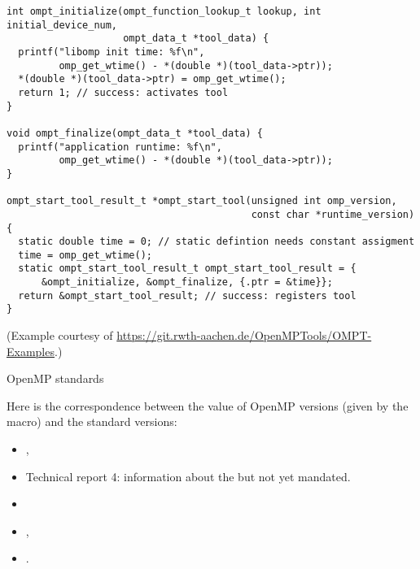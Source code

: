\begin{lstlisting}
int ompt_initialize(ompt_function_lookup_t lookup, int initial_device_num,
                    ompt_data_t *tool_data) {
  printf("libomp init time: %f\n",
         omp_get_wtime() - *(double *)(tool_data->ptr));
  *(double *)(tool_data->ptr) = omp_get_wtime();
  return 1; // success: activates tool
}

void ompt_finalize(ompt_data_t *tool_data) {
  printf("application runtime: %f\n",
         omp_get_wtime() - *(double *)(tool_data->ptr));
}

ompt_start_tool_result_t *ompt_start_tool(unsigned int omp_version,
                                          const char *runtime_version) {
  static double time = 0; // static defintion needs constant assigment
  time = omp_get_wtime();
  static ompt_start_tool_result_t ompt_start_tool_result = {
      &ompt_initialize, &ompt_finalize, {.ptr = &time}};
  return &ompt_start_tool_result; // success: registers tool
}  
\end{lstlisting}
(Example courtesy of \url{https://git.rwth-aachen.de/OpenMPTools/OMPT-Examples}.)

 {OpenMP standards}
\label{sec:omp-standards}

Here is the correspondence between the value of OpenMP versions
(given by the  macro)
and the standard versions:

\begin{itemize}
\item {} ,
\item {} Technical report 4: information about the 
  but not yet mandated.
\item {} 
\item {} ,
\item {} .
\end{itemize}
